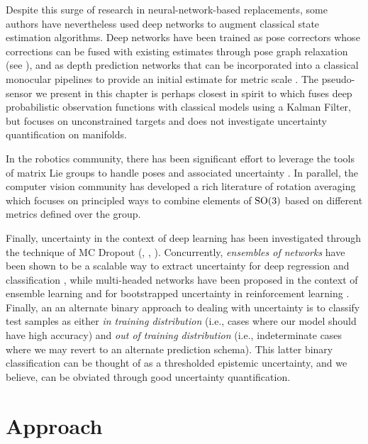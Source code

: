 Despite this surge of research in neural-network-based replacements, some authors have nevertheless used deep networks to augment classical state estimation algorithms. Deep networks have been trained as pose correctors whose corrections can be fused with existing estimates through pose graph relaxation \citep{2018_Peretroukhin_Deep} (see ), and as  depth prediction networks that can be incorporated into a classical monocular pipelines to provide an initial estimate for metric scale \citep{yang:2018}. The pseudo-sensor we present in this chapter is perhaps closest in spirit to \citep{Haarnoja2016-ph} which fuses deep probabilistic observation functions with classical models using a Kalman Filter, but focuses on unconstrained targets and does not investigate uncertainty quantification on manifolds.

In the robotics community, there has been significant effort to leverage the tools of matrix Lie groups to handle poses and associated uncertainty \citep{Sola2018-kg, Barfoot2014-ac}. In parallel, the computer vision community has developed a rich literature of rotation averaging \citep{Hartley2013-rc} which focuses on principled ways to combine elements of $\mathrm{SO}(3)$ based on different metrics defined over the group.

Finally, uncertainty in the context of deep learning has been investigated through the technique of MC Dropout (, \cite{Gal2016UncertaintyThesis}, \cite{Kendall2017-vs}). Concurrently, \textit{ensembles of networks} have been shown to be a scalable way to extract uncertainty for deep regression and classification  \citep{Lakshminarayanan2017}, while multi-headed networks have been proposed in the context of ensemble learning \citep{Lee2015-af} and for bootstrapped uncertainty in reinforcement learning \citep{Osband2016}. Finally, an an alternate binary approach \citep{richter2017safe} to dealing with uncertainty is to classify test samples as either \textit{in training distribution} (i.e., cases where our model should have high accuracy) and \textit{out of training distribution} (i.e., indeterminate cases where we may revert to an alternate prediction schema). This latter binary classification can be thought of as a thresholded epistemic uncertainty, and we believe, can be obviated through good uncertainty quantification. 

\section{Approach}

